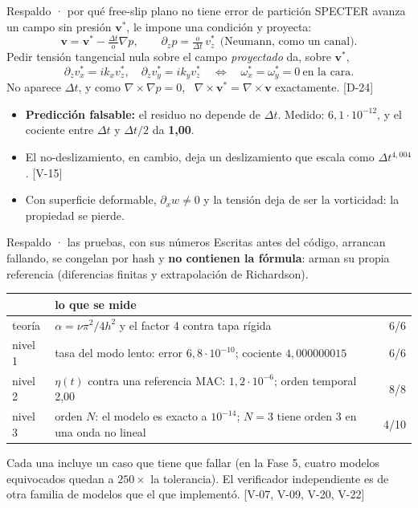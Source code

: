 \documentclass[aspectratio=169,10pt]{beamer}
\newcommand{\etq}[1]{{\color{azulc}\scriptsize[#1]}}
\begin{document}
\begin{frame}[t]{Respaldo · por qué free-slip plano no tiene error de partición}
\small
SPECTER avanza un campo sin presión $\mathbf v^*$, le impone una condición y proyecta:
\[
\mathbf v=\mathbf v^*-\tfrac{\Delta t}{o}\nabla p,\qquad \partial_z p=\tfrac{o}{\Delta t}\,v^*_z\ \ \text{(Neumann, como un canal)}.
\]
Pedir tensión tangencial nula sobre el campo \emph{proyectado} da, sobre $\mathbf v^*$,
\[
\partial_z v^*_x = i k_x v^*_z,\quad \partial_z v^*_y = i k_y v^*_z
\quad\Longleftrightarrow\quad \omega^*_x=\omega^*_y=0\ \text{en la cara.}
\]
No aparece $\Delta t$, y como $\nabla\times\nabla p=0$, \ $\nabla\times\mathbf v^*=\nabla\times\mathbf v$ exactamente. \etq{D-24}
\begin{itemize}\setlength{\itemsep}{3pt}
\item \textbf{Predicción falsable:} el residuo no depende de $\Delta t$. Medido: $6{,}1\cdot10^{-12}$, y el cociente entre $\Delta t$ y $\Delta t/2$ da \textbf{1,00}.
\item El no-deslizamiento, en cambio, deja un deslizamiento que escala como $\Delta t^{4{,}004}$. \etq{V-15}
\item Con superficie deformable, $\partial_x w\neq0$ y la tensión deja de ser la vorticidad: la propiedad se pierde.
\end{itemize}
\end{frame}

\begin{frame}[t]{Respaldo · las pruebas, con sus números}
\small
Escritas antes del código, arrancan fallando, se congelan por hash y \textbf{no contienen la fórmula}: arman su propia referencia (diferencias finitas y extrapolación de Richardson).

\vspace{6pt}
\begin{tabular}{@{}l l r@{}}
\toprule
& lo que se mide & \\
\midrule
teoría & $\alpha=\nu\pi^2/4h^2$ y el factor 4 contra tapa rígida & 6/6\\
nivel 1 & tasa del modo lento: error $6{,}8\cdot10^{-10}$; cociente $4{,}000000015$ & 6/6\\
nivel 2 & $\eta(t)$ contra una referencia MAC: $1{,}2\cdot10^{-6}$; orden temporal 2,00 & 8/8\\
nivel 3 & orden $N$: el modelo es exacto a $10^{-14}$; $N=3$ tiene orden 3 en una onda no lineal & 4/10\\
\bottomrule
\end{tabular}

\vspace{8pt}
Cada una incluye un caso que tiene que fallar (en la Fase 5, cuatro modelos equivocados quedan a $250\times$ la tolerancia).
El verificador independiente es de otra familia de modelos que el que implementó. \etq{V-07, V-09, V-20, V-22}
\end{frame}
\end{document}
